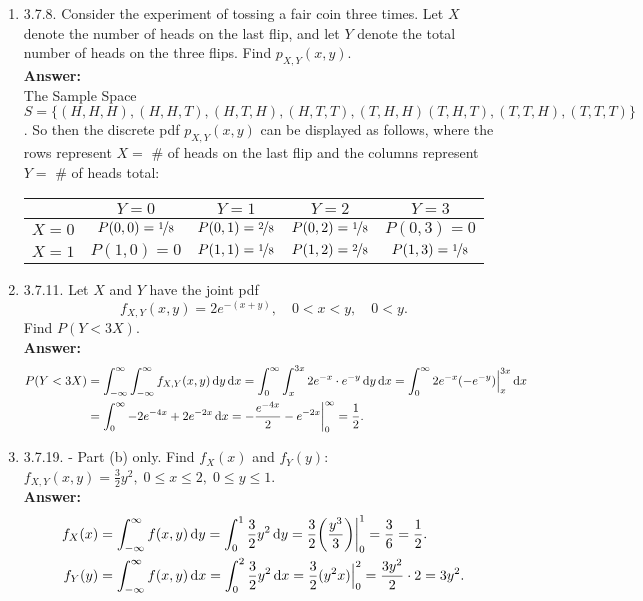 \documentclass{article}
\begin{document}
\begin{enumerate}
        \item 3.7.8. Consider the experiment of tossing a fair coin three times. Let $X$ denote the number of heads on the last flip, and let $Y$ denote the total number of heads on the three flips. Find $p_{X,Y}(x,y)$.\\
        \textbf{Answer: }\\
        The Sample Space $S = \{(H,H,H),(H,H,T),(H,T,H),(H,T,T),(T,H,H)(T,H,T),(T,T,H),(T,T,T)\}$. So then the discrete pdf $p_{X,Y}(x,y)$ can be displayed as follows, where the rows represent $X = $ \# of heads on the last flip and the columns represent $Y = $ \# of heads total:
        \begin{center}
            \begin{tabular}{|c|| c| c| c| c|}
                \hline
                & $Y=0$ & $Y=1$ & $Y=2$ & $Y=3$\\
                \hline\hline
                $X=0$ & $P(0,0) = \nicefrac{1}{8}$ & $P(0,1) = \nicefrac{2}{8}$ & $P(0,2) = \nicefrac{1}{8}$ & $P(0,3) = 0$\\
                \hline
                $X=1$ & $P(1,0) = 0$ & $P(1,1) = \nicefrac{1}{8}$ & $P(1,2) = \nicefrac{2}{8}$ & $P(1,3) = \nicefrac{1}{8}$\\
                \hline
                \end{tabular}
            \end{center}
        
        \item 3.7.11. Let $X$ and $Y$ have the joint pdf
            \[f_{X,Y}(x,y) = 2e^{-(x+y)}, \quad 0 < x < y, \quad 0 < y.\]
        Find $P(Y < 3X)$.\\
        \textbf{Answer: }
        \begin{align*}
            P(Y < 3X) &= \int_{-\infty}^\infty\int_{-\infty}^\infty f_{X,Y} (x,y) \dif y \dif x = \int_0^\infty\int_x^{3x} 2e^{-x} \cdot e^{-y} \dif y \dif x = \int_0^\infty 2e^{-x}(-e^{-y})\Big|_x^{3x} \dif x\\
            &= \int_0^\infty -2e^{-4x}+2e^{-2x} \dif x = -\frac{e^{-4x}}{2}-e^{-2x}\bigg|_0^\infty = \frac{1}{2}.
        \end{align*}
        
        \item 3.7.19. - Part (b) only. Find $f_X(x)$ and $f_Y(y)$: $f_{X,Y}(x,y) = \frac{3}{2}y^2, \; 0 \leq x \leq 2, \; 0 \leq y \leq 1$.\\
        \textbf{Answer: }
        \begin{align*}
            f_X(x) &= \int_{-\infty}^\infty f(x,y) \dif y = \int_0^1 \frac{3}{2}y^2 \dif y = \frac{3}{2}\bigg(\frac{y^3}{3}\bigg)\bigg|_0^1 = \frac{3}{6} = \frac{1}{2}.\\
            f_Y(y) &= \int_{-\infty}^\infty f(x,y) \dif x = \int_0^2 \frac{3}{2}y^2 \dif x = \frac{3}{2}(y^2x)\Big|_0^2 = \frac{3y^2}{2} \cdot 2 = 3y^2.
        \end{align*}
        

\end{enumerate}
\end{document}
